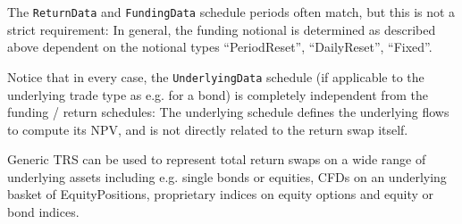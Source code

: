 The {\tt ReturnData} and {\tt FundingData} schedule periods often match, but this is not a strict requirement: In
general, the funding notional is determined as described above dependent on the notional types ``PeriodReset'',
``DailyReset'', ``Fixed''.

Notice that in every case, the {\tt UnderlyingData} schedule (if applicable to the underlying trade type as e.g. for a
bond) is completely independent from the funding / return schedules: The underlying schedule defines the underlying
flows to compute its NPV, and is not directly related to the return swap itself.

Generic TRS can be used to represent total return swaps on a wide range of underlying assets including e.g. single bonds
or equities, CFDs on an underlying basket of EquityPositions, proprietary indices on equity options and equity or bond
indices.

